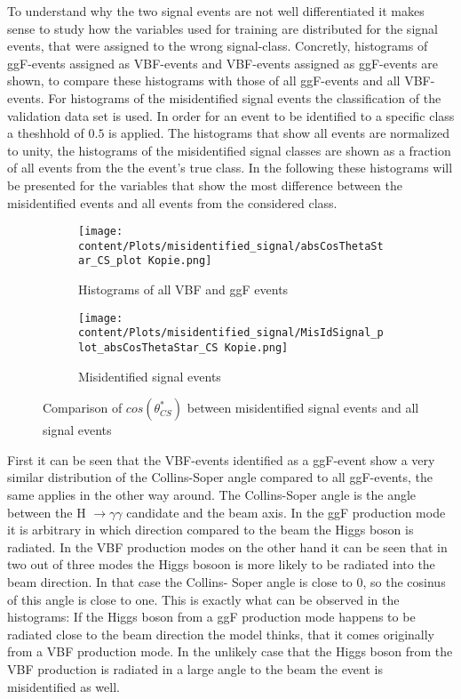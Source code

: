 To understand why the two signal events are not well differentiated it makes sense to study how the variables used for training are distributed for the signal events, that were assigned to the wrong signal-class.
Concretly, histograms of ggF-events assigned as VBF-events and VBF-events assigned as ggF-events are shown, to compare these histograms with those of all ggF-events and all VBF-events. For histograms of the misidentified signal events
the classification of the validation data set is used. In order for an event to be identified to a specific class a theshhold of $0.5$ is applied. The histograms that show all events are normalized to unity, the histograms of the misidentified signal classes
are shown as a fraction of all events from the the event's true class.
In the following these histograms will be presented for the variables that show the most difference between the misidentified events and all events from the considered class.


\begin{figure}[H]
    \centering
    \begin{subfigure}{0.45\textwidth}
        \centering
        \texttt{[image: content/Plots/misidentified\_signal/absCosThetaStar\_CS\_plot Kopie.png]}
        \caption{Histograms of all VBF and ggF events}
        \label{fig:roc1}
    \end{subfigure}
    \hfill
    \begin{subfigure}{0.45\textwidth}
        \centering
        \texttt{[image: content/Plots/misidentified\_signal/MisIdSignal\_plot\_absCosThetaStar\_CS Kopie.png]}
        \caption{Misidentified signal events}
        \label{fig:roc2}
    \end{subfigure}
    \caption{Comparison of $cos(\theta_{CS}^*)$ between misidentified signal events and all signal events}
    \label{fig:combined_roc}
\end{figure}

First it can be seen that the VBF-events identified as a ggF-event show a very similar distribution of the Collins-Soper angle compared to all ggF-events, the same applies in the other way around.
The Collins-Soper angle is the angle between the H $\rightarrow \gamma \gamma$ candidate and the beam axis. In the ggF production mode it is arbitrary in which direction compared to the beam 
the Higgs boson is radiated. In the VBF production modes on the other hand it can be seen that in two out of three modes the Higgs bosoon is more likely to be radiated into the beam direction. In that case the Collins-
Soper angle is close to $0$, so the cosinus of this angle is close to one. This is exactly what can be observed in the histograms: If the Higgs boson from a ggF production mode happens to be radiated
close to the beam direction the model thinks, that it comes originally from a VBF production mode. In the unlikely case that the Higgs boson from the VBF production is radiated in a large angle to the beam the event is misidentified as well.

